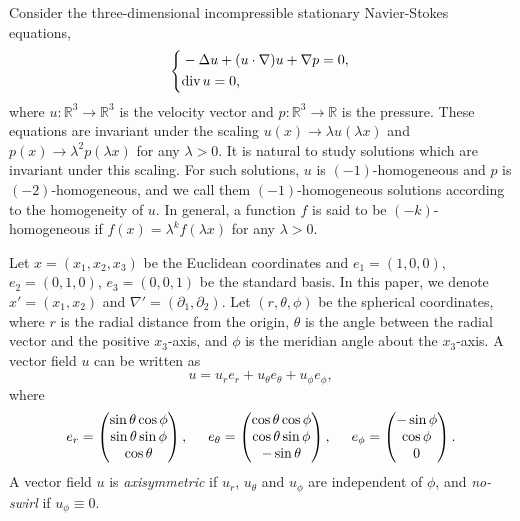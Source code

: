 \documentclass[12pt]{article}
\newcommand{\dive}{{\rm div \hspace{0.05cm} }}
\begin{document}
Consider the three-dimensional incompressible stationary Navier-Stokes equations, 
\begin{equation}\label{eq:NS}
	\left\{
	\begin{aligned}
		& -\Delta u + ( u \cdot \nabla ) u + \nabla p = 0, \\ 
		& \dive u=0,
	\end{aligned}
	\right.
\end{equation}
where $u: \mathbb{R}^3\to\mathbb{R}^3$ is the velocity vector and $p:\mathbb{R}^3\to\mathbb{R}$ is the pressure. These equations are invariant under the scaling $u(x)\to \lambda u(\lambda x)$ and $p(x)\to \lambda^2 p(\lambda x)$ for any $\lambda>0$. It is natural to study solutions which are invariant under this scaling. For such solutions, $u$ is $(-1)$-homogeneous and $p$ is $(-2)$-homogeneous, and we call them $(-1)$-homogeneous solutions according to the homogeneity of $u$. In general, a function $f$ is said to be $(-k)$-homogeneous if $f(x)= \lambda^k f(\lambda x)$ for any $\lambda>0$. 

Let $x=(x_1,x_2,x_3)$ be the Euclidean coordinates and $e_1=(1,0,0)$, $e_2=(0,1,0)$, $e_3=(0,0,1)$ be the standard basis. In this paper, we denote $x'=(x_1,x_2)$ and $\nabla'=(\partial_1, \partial_2)$. Let $(r,\theta, \phi)$ be the spherical coordinates, where $r$ is the radial distance from the origin, $\theta$ is the angle between the radial vector and the positive $x_3$-axis, and $\phi$ is the meridian angle about the $x_3$-axis. A vector field $u$ can be written as
\[
	u = u_r e_r + u_\theta e_{\theta} + u_\phi e_{\phi},
\]
where
\[
	e_r = \left(
	\begin{matrix}
		\sin\theta\cos\phi \\
		\sin\theta\sin\phi \\
		\cos\theta
	\end{matrix} \right), \hspace{0.5cm}
	e_{\theta} = \left(
	\begin{matrix}
		\cos\theta\cos\phi \\
		\cos\theta\sin\phi \\
		-\sin\theta	
	\end{matrix} \right), \hspace{0.5cm}
	e_{\phi} = \left(
	\begin{matrix}
		-\sin\phi \\ \cos\phi \\ 0
	\end{matrix} \right).
\]
A vector field $u$ is \emph{axisymmetric} if $u_r$, $u_{\theta}$ and $u_{\phi}$ are independent of $\phi$, and \emph{no-swirl} if $u_{\phi}\equiv 0$. 
\end{document}
